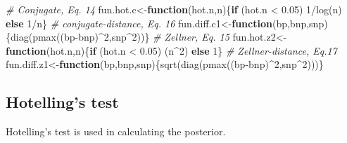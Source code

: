 \documentclass[
]{article}
\newenvironment{Shaded}{\begin{snugshade}}{\end{snugshade}}
\newcommand{\CommentTok}[1]{\textcolor[rgb]{0.56,0.35,0.01}{\textit{#1}}}
\newcommand{\ControlFlowTok}[1]{\textcolor[rgb]{0.13,0.29,0.53}{\textbf{#1}}}
\newcommand{\DecValTok}[1]{\textcolor[rgb]{0.00,0.00,0.81}{#1}}
\newcommand{\FloatTok}[1]{\textcolor[rgb]{0.00,0.00,0.81}{#1}}
\newcommand{\FunctionTok}[1]{\textcolor[rgb]{0.00,0.00,0.00}{#1}}
\newcommand{\NormalTok}[1]{#1}
\newcommand{\OtherTok}[1]{\textcolor[rgb]{0.56,0.35,0.01}{#1}}
\newcommand{\SpecialCharTok}[1]{\textcolor[rgb]{0.00,0.00,0.00}{#1}}
\begin{document}
\begin{Shaded}
\begin{Highlighting}[]
\CommentTok{\# Conjugate, Eq. 14}
\NormalTok{fun.hot.c}\OtherTok{\textless{}{-}}\ControlFlowTok{function}\NormalTok{(hot.n,n)\{}\ControlFlowTok{if}\NormalTok{ (hot.n }\SpecialCharTok{\textless{}} \FloatTok{0.05}\NormalTok{) }\DecValTok{1}\SpecialCharTok{/}\FunctionTok{log}\NormalTok{(n) }\ControlFlowTok{else} \DecValTok{1}\SpecialCharTok{/}\NormalTok{n\}   }
\CommentTok{\# conjugate{-}distance, Eq. 16}
\NormalTok{fun.diff.c1}\OtherTok{\textless{}{-}}\ControlFlowTok{function}\NormalTok{(bp,bnp,snp)\{}\FunctionTok{diag}\NormalTok{(}\FunctionTok{pmax}\NormalTok{((bp}\SpecialCharTok{{-}}\NormalTok{bnp)}\SpecialCharTok{\^{}}\DecValTok{2}\NormalTok{,snp}\SpecialCharTok{\^{}}\DecValTok{2}\NormalTok{))\}     }
\CommentTok{\# Zellner, Eq. 15}
\NormalTok{fun.hot.z2}\OtherTok{\textless{}{-}}\ControlFlowTok{function}\NormalTok{(hot.n,n)\{}\ControlFlowTok{if}\NormalTok{ (hot.n }\SpecialCharTok{\textless{}} \FloatTok{0.05}\NormalTok{) (n}\SpecialCharTok{\^{}}\DecValTok{2}\NormalTok{) }\ControlFlowTok{else} \DecValTok{1}\NormalTok{\} }
\CommentTok{\# Zellner{-}distance, Eq.17}
\NormalTok{fun.diff.z1}\OtherTok{\textless{}{-}}\ControlFlowTok{function}\NormalTok{(bp,bnp,snp)\{}\FunctionTok{sqrt}\NormalTok{(}\FunctionTok{diag}\NormalTok{(}\FunctionTok{pmax}\NormalTok{((bp}\SpecialCharTok{{-}}\NormalTok{bnp)}\SpecialCharTok{\^{}}\DecValTok{2}\NormalTok{,snp}\SpecialCharTok{\^{}}\DecValTok{2}\NormalTok{)))\}     }
\end{Highlighting}
\end{Shaded}

\hypertarget{hotellings-test}{%
\subsection{Hotelling's test}\label{hotellings-test}}

Hotelling's test is used in calculating the posterior.
\end{document}
